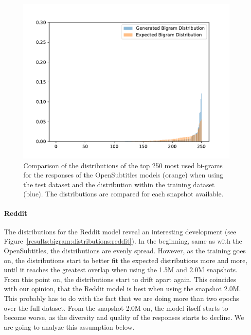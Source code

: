 \begin{figure}[H]
	\centering
	\small
	\endminipage\hfill
	\includegraphics[width=\linewidth]{img/plots/opensubtitles_not_reversed/bigram_distribution_comparison_step_3000000.pdf}
	\centering
	\small
	\endminipage\hfill
	\caption{Comparison of the distributions of the top 250 most used bi-grams for the responses of the OpenSubtitles models (orange) when using the test dataset and the distribution within the training dataset (blue). The distributions are compared for each snapshot available.}
	\label{results:bigram:distributions:opensubtitles}
\end{figure}

\paragraph{Reddit} The distributions for the Reddit model reveal an interesting development (see Figure~\ref{results:bigram:distributions:reddit}). In the beginning, same as with the OpenSubtitles, the distributions are evenly spread. However, as the training goes on, the distributions start to better fit the expected distributions more and more, until it reaches the greatest overlap when using the 1.5M and 2.0M snapshots. From this point on, the distributions start to drift apart again. This coincides with our opinion, that the Reddit model is best when using the snapshot 2.0M. This probably has to do with the fact that we are doing more than two epochs over the full dataset. From the snapshot 2.0M on, the model itself starts to become worse, as the diversity and quality of the responses starts to decline. We are going to analyze this assumption below.

